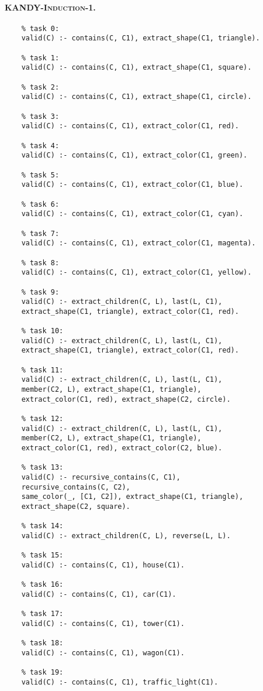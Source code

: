 \paragraph{\textsc{KANDY-Induction-1}.}

\begin{verbatim}
	% task 0:
	valid(C) :- contains(C, C1), extract_shape(C1, triangle).
	
	% task 1:
	valid(C) :- contains(C, C1), extract_shape(C1, square).
	
	% task 2:
	valid(C) :- contains(C, C1), extract_shape(C1, circle).
	
	% task 3:
	valid(C) :- contains(C, C1), extract_color(C1, red).
	
	% task 4:
	valid(C) :- contains(C, C1), extract_color(C1, green).
	
	% task 5:
	valid(C) :- contains(C, C1), extract_color(C1, blue).
	
	% task 6:
	valid(C) :- contains(C, C1), extract_color(C1, cyan).
	
	% task 7:
	valid(C) :- contains(C, C1), extract_color(C1, magenta).
	
	% task 8:
	valid(C) :- contains(C, C1), extract_color(C1, yellow).
	
	% task 9:
	valid(C) :- extract_children(C, L), last(L, C1), 
	extract_shape(C1, triangle), extract_color(C1, red).
	
	% task 10:
	valid(C) :- extract_children(C, L), last(L, C1), 
	extract_shape(C1, triangle), extract_color(C1, red).
	
	% task 11:
	valid(C) :- extract_children(C, L), last(L, C1), 
	member(C2, L), extract_shape(C1, triangle), 
	extract_color(C1, red), extract_shape(C2, circle).
	
	% task 12:
	valid(C) :- extract_children(C, L), last(L, C1), 
	member(C2, L), extract_shape(C1, triangle), 
	extract_color(C1, red), extract_color(C2, blue).
	
	% task 13:
	valid(C) :- recursive_contains(C, C1), 
	recursive_contains(C, C2), 
	same_color(_, [C1, C2]), extract_shape(C1, triangle), 
	extract_shape(C2, square).
	
	% task 14:
	valid(C) :- extract_children(C, L), reverse(L, L).
	
	% task 15:
	valid(C) :- contains(C, C1), house(C1).
	
	% task 16:
	valid(C) :- contains(C, C1), car(C1).
	
	% task 17:
	valid(C) :- contains(C, C1), tower(C1).
	
	% task 18:
	valid(C) :- contains(C, C1), wagon(C1).
	
	% task 19:
	valid(C) :- contains(C, C1), traffic_light(C1).
	
\end{verbatim}

